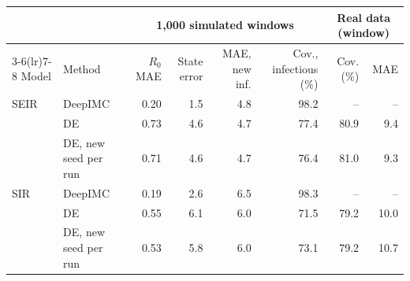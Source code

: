 \begin{tabular}{llrrrrrr}
\toprule
 &  & \multicolumn{4}{c}{1,000 simulated windows} & \multicolumn{2}{c}{Real data (window)} \\
\cmidrule(lr){3-6}\cmidrule(lr){7-8}
Model & Method & $R_0$ MAE & State error & MAE, new inf. & Cov., infectious (\%) & Cov. (\%) & MAE \\
\midrule
SEIR & DeepIMC & 0.20 & 1.5 & 4.8 & 98.2 & -- & -- \\
 & DE & 0.73 & 4.6 & 4.7 & 77.4 & 80.9 & 9.4 \\
 & DE, new seed per run & 0.71 & 4.6 & 4.7 & 76.4 & 81.0 & 9.3 \\
\midrule
SIR & DeepIMC & 0.19 & 2.6 & 6.5 & 98.3 & -- & -- \\
 & DE & 0.55 & 6.1 & 6.0 & 71.5 & 79.2 & 10.0 \\
 & DE, new seed per run & 0.53 & 5.8 & 6.0 & 73.1 & 79.2 & 10.7 \\
\bottomrule
\end{tabular}
